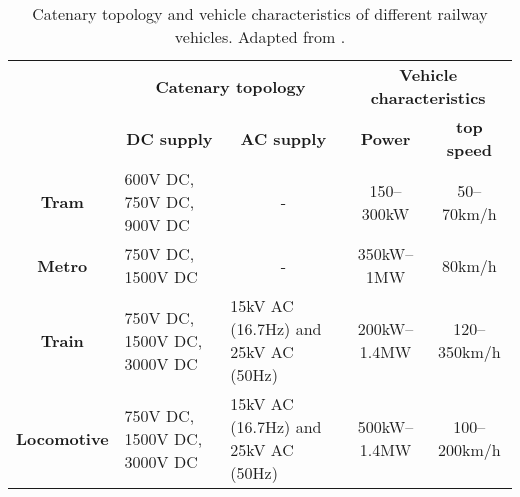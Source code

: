\begin{table}[htbp]
	\centering
	\caption{Catenary topology and vehicle characteristics of different railway vehicles.  Adapted from \cite{abad2016}.}
	\begin{tabular}{|c|p{10.145em}p{10.355em}|cc|}
		\cmidrule{2-5}    \multicolumn{1}{c|}{} & \multicolumn{2}{c|}{\textbf{Catenary topology}} & \multicolumn{2}{c|}{\textbf{Vehicle characteristics}} \\
		\cmidrule{2-5}    \multicolumn{1}{c|}{} & \multicolumn{1}{c}{\textbf{DC supply}} & \multicolumn{1}{c|}{\textbf{AC supply}} & \textbf{Power} & \textbf{top speed} \\
		\midrule
		\textbf{Tram} & 600V DC, 750V DC, 900V DC & \multicolumn{1}{c}{-}     & 150–300kW & 50–70km/h \\
		\midrule
		\textbf{Metro} & 750V DC, 1500V DC & \multicolumn{1}{c}{-}     & 350kW–1MW & 80km/h \\
		\midrule
		\textbf{Train} & 750V DC, 1500V DC, 3000V DC & 15kV AC (16.7Hz) and 25kV AC (50Hz) & 200kW–1.4MW & 120–350km/h \\
		\midrule
		\textbf{Locomotive} & 750V DC, 1500V DC, 3000V DC & 15kV AC (16.7Hz) and 25kV AC (50Hz) & 500kW–1.4MW & 100–200km/h \\
		\bottomrule
	\end{tabular}%
	\label{tab:31.t1}%
\end{table}%
